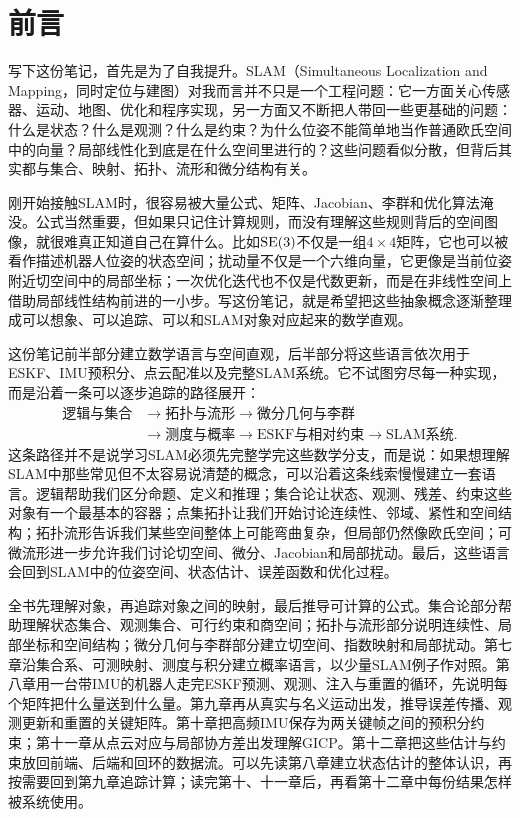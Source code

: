 \chapter*{前言}



写下这份笔记，首先是为了自我提升。SLAM（Simultaneous Localization and Mapping，同时定位与建图）对我而言并不只是一个工程问题：它一方面关心传感器、运动、地图、优化和程序实现，另一方面又不断把人带回一些更基础的问题：什么是状态？什么是观测？什么是约束？为什么位姿不能简单地当作普通欧氏空间中的向量？局部线性化到底是在什么空间里进行的？这些问题看似分散，但背后其实都与集合、映射、拓扑、流形和微分结构有关。

刚开始接触SLAM时，很容易被大量公式、矩阵、Jacobian、李群和优化算法淹没。公式当然重要，但如果只记住计算规则，而没有理解这些规则背后的空间图像，就很难真正知道自己在算什么。比如$\operatorname{SE}(3)$不仅是一组$4\times4$矩阵，它也可以被看作描述机器人位姿的状态空间；扰动量不仅是一个六维向量，它更像是当前位姿附近切空间中的局部坐标；一次优化迭代也不仅是代数更新，而是在非线性空间上借助局部线性结构前进的一小步。写这份笔记，就是希望把这些抽象概念逐渐整理成可以想象、可以追踪、可以和SLAM对象对应起来的数学直观。

这份笔记前半部分建立数学语言与空间直观，后半部分将这些语言依次用于ESKF、IMU预积分、点云配准以及完整SLAM系统。它不试图穷尽每一种实现，而是沿着一条可以逐步追踪的路径展开：
\[
    \begin{aligned}
    \text{逻辑与集合}
    &\longrightarrow\text{拓扑与流形}
    \longrightarrow\text{微分几何与李群}\\
    &\longrightarrow\text{测度与概率}
    \longrightarrow\text{ESKF与相对约束}\longrightarrow\text{SLAM系统}.
    \end{aligned}
\]
这条路径并不是说学习SLAM必须先完整学完这些数学分支，而是说：如果想理解SLAM中那些常见但不太容易说清楚的概念，可以沿着这条线索慢慢建立一套语言。逻辑帮助我们区分命题、定义和推理；集合论让状态、观测、残差、约束这些对象有一个最基本的容器；点集拓扑让我们开始讨论连续性、邻域、紧性和空间结构；拓扑流形告诉我们某些空间整体上可能弯曲复杂，但局部仍然像欧氏空间；可微流形进一步允许我们讨论切空间、微分、Jacobian和局部扰动。最后，这些语言会回到SLAM中的位姿空间、状态估计、误差函数和优化过程。

全书先理解对象，再追踪对象之间的映射，最后推导可计算的公式。集合论部分帮助理解状态集合、观测集合、可行约束和商空间；拓扑与流形部分说明连续性、局部坐标和空间结构；微分几何与李群部分建立切空间、指数映射和局部扰动。第七章沿集合系、可测映射、测度与积分建立概率语言，以少量SLAM例子作对照。第八章用一台带IMU的机器人走完ESKF预测、观测、注入与重置的循环，先说明每个矩阵把什么量送到什么量。第九章再从真实与名义运动出发，推导误差传播、观测更新和重置的关键矩阵。第十章把高频IMU保存为两关键帧之间的预积分约束；第十一章从点云对应与局部协方差出发理解GICP。第十二章把这些估计与约束放回前端、后端和回环的数据流。可以先读第八章建立状态估计的整体认识，再按需要回到第九章追踪计算；读完第十、十一章后，再看第十二章中每份结果怎样被系统使用。

